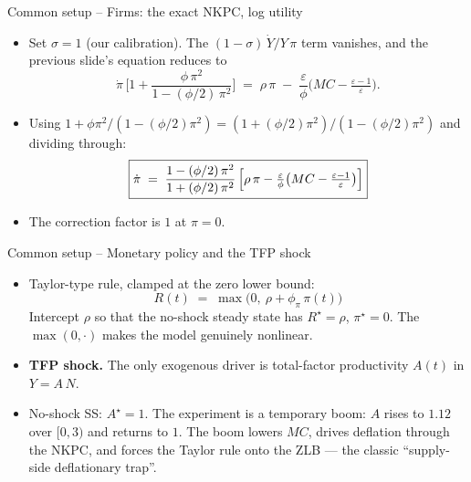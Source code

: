 \documentclass[11pt,aspectratio=169]{beamer}
\begin{document}
\begin{frame}{Common setup -- Firms: the exact NKPC, log utility}

\begin{itemize}

\item Set $\sigma = 1$ (our calibration). The $(1-\sigma)\,\dot Y/Y\,\pi$
  term vanishes, and the previous slide's equation reduces to
  \[
  \dot\pi\,\Big[1 + \frac{\phi\,\pi^2}{1 - (\phi/2)\,\pi^2}\Big]
  \;=\; \rho\,\pi \;-\; \frac{\varepsilon}{\phi}\Big(MC - \tfrac{\varepsilon-1}{\varepsilon}\Big).
  \]

\item Using
  $1 + \phi\pi^2/(1-(\phi/2)\pi^2) = (1+(\phi/2)\pi^2)/(1-(\phi/2)\pi^2)$
  and dividing through:
  \[
  \boxed{\dot\pi \;=\; \frac{1 - (\phi/2)\,\pi^2}{1 + (\phi/2)\,\pi^2}\,
  \Bigl[\rho\,\pi - \tfrac{\varepsilon}{\phi}\bigl(MC - \tfrac{\varepsilon-1}{\varepsilon}\bigr)\Bigr]}
  \]

\item The correction factor is $1$ at $\pi = 0$.

\end{itemize}

\end{frame}

\begin{frame}{Common setup -- Monetary policy and the TFP shock}

\begin{itemize}

\item Taylor-type rule, clamped at the zero lower bound:
  \[
  \boxed{R(t) \;=\; \max\bigl(0,\ \rho + \phi_\pi\,\pi(t)\bigr)}
  \]
  Intercept $\rho$ so that the no-shock steady state has $R^\star=\rho$,
  $\pi^\star=0$. The $\max(0,\cdot)$ makes the model genuinely nonlinear.\newline

\item \textbf{TFP shock.} The only exogenous driver is total-factor
  productivity $A(t)$ in $Y = A\,N$.\newline

\item No-shock SS: $A^\star = 1$. The experiment is a temporary boom:
  $A$ rises to $1.12$ over $[0, 3)$ and returns to $1$. The boom lowers
  $MC$, drives deflation through the NKPC, and forces the Taylor rule
  onto the ZLB --- the classic ``supply-side deflationary trap''.

\end{itemize}

\end{frame}
\end{document}
